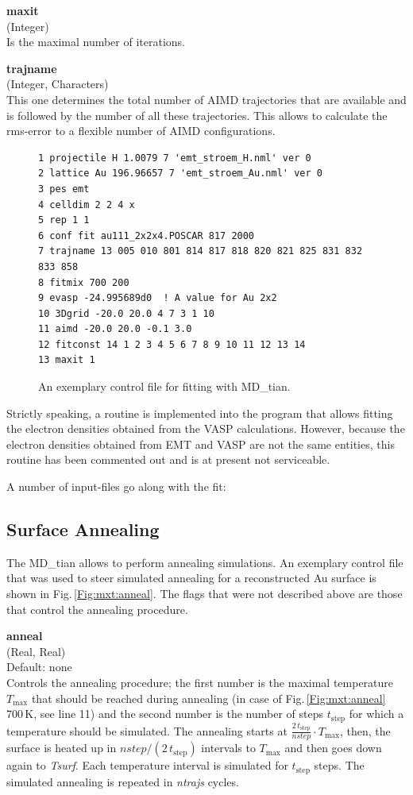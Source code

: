 \documentclass[twoside, 11pt, titlepage, captions=nooneline, a4paper, headsepline]{scrbook}%
\newcommand{\9}{\mathrm}
\newcommand{\0}{\,\mathrm}
\begin{document}
\noindent\textbf{maxit}\\
(Integer)\\
Is the maximal number of iterations.

\noindent\textbf{trajname}\\
(Integer, Characters)\\
This one determines the total number of AIMD trajectories that are available and is followed by the number of all these trajectories. This allows to calculate the rms-error to a flexible number of AIMD configurations.\\


\begin{figure}[t!]
\begin{verbatim}
1 projectile H 1.0079 7 'emt_stroem_H.nml' ver 0
2 lattice Au 196.96657 7 'emt_stroem_Au.nml' ver 0
3 pes emt
4 celldim 2 2 4 x
5 rep 1 1
6 conf fit au111_2x2x4.POSCAR 817 2000
7 trajname 13 005 010 801 814 817 818 820 821 825 831 832 833 858
8 fitmix 700 200
9 evasp -24.995689d0  ! A value for Au 2x2
10 3Dgrid -20.0 20.0 4 7 3 1 10
11 aimd -20.0 20.0 -0.1 3.0
12 fitconst 14 1 2 3 4 5 6 7 8 9 10 11 12 13 14
13 maxit 1 
\end{verbatim}
\caption{\label{Fig:mxt:fitting}An exemplary control file for fitting with MD\_tian.}
\end{figure}

Strictly speaking, a routine is implemented into the program that allows fitting the electron densities obtained from the VASP calculations. However, because the electron densities obtained from EMT and VASP are not the same entities, this routine has been commented out and is at present not serviceable.

A number of input-files go along with the fit:

\subsection{Surface Annealing}
The MD\_tian allows to perform annealing simulations. An exemplary control file that was used to steer simulated annealing for a reconstructed Au surface is shown in Fig.\,\ref{Fig:mxt:anneal}. The flags that were not described above are those that control the annealing procedure.

\textbf{anneal}\\
(Real, Real)\\
Default: none\\
Controls the annealing procedure; the first number is the maximal temperature $T_\mathrm{max}$ that should be reached during annealing (in case of Fig.\,\ref{Fig:mxt:anneal} 700\,K, see line 11) and the second number is the number of steps $t_\mathrm{step}$ for which a temperature should be simulated.
The annealing starts at $\tfrac{2\,t_\mathrm{step}}{nstep} \cdot T_\mathrm{max}$, then, the surface is heated up in $nstep/(2\,t_\mathrm{step})$ intervals to $T_\mathrm{max}$ and then goes down again to \textit{Tsurf}. Each temperature interval is simulated for $t_\mathrm{step}$ steps. The simulated annealing is repeated in \textit{ntrajs} cycles.
\end{document}

